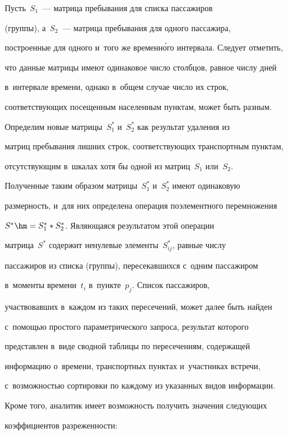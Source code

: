       


      Пусть~$S_1$~--- матрица пребывания для списка пассажиров 


(группы), а~$S_2$~--- матрица пребывания для одного пассажира, 


построенные для одного и~того же временн\'{о}го интервала. Следует отметить, 


что данные матрицы имеют одинаковое число столбцов, равное числу дней 


в~интервале времени, однако в~общем случае число их строк, 


соответствующих посещенным населенным пунктам, может быть разным. 


Определим новые матрицы~$S_1^*$ и~$S_2^*$ как результат удаления из 


матриц пребывания лишних строк, соответствующих транспортным пунктам, 


отсутствующим в~шкалах хотя бы одной из матриц~$S_1$ или~$S_2$. 


Полученные таким образом матрицы~$S_1^*$ и~$S_2^*$ имеют одинаковую 


размерность, и~для них определена операция поэлементного перемножения 


$S^*\hm= S_1^* * S_2^*$. Являющаяся результатом этой операции 


матрица~$S^*$ содержит ненулевые элементы~$S_{ij}^*$, равные числу 


пассажиров из списка (группы), пересекавшихся с~одним пассажиром 


в~моменты времени~$t_i$ в~пункте~$p_j$. Список пассажиров, 


участвовавших в~каждом из таких пересечений, может далее быть найден 


с~по\-мощью простого па\-ра\-мет\-ри\-че\-ско\-го запроса, результат которого 


представлен в~виде сводной таб\-ли\-цы по пересечениям, содержащей 


информацию о~времени, транспортных пунктах и~участниках встречи, 


с~возможностью сортировки по каждому из указанных видов информации. 


Кроме того, аналитик имеет возможность получить значения следующих 


коэффициентов разреженности:


